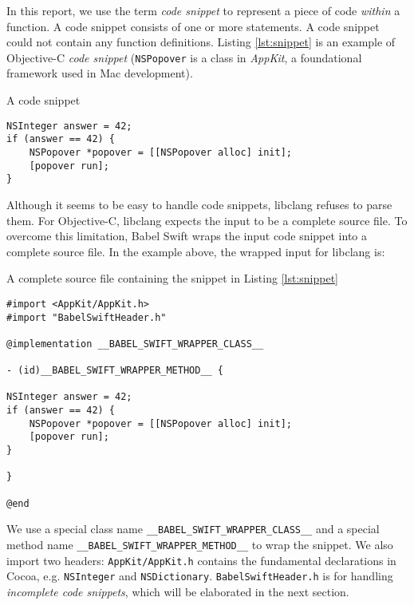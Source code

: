 \documentclass{sfuthesis}
\begin{document}
In this report, we use the term \emph{code snippet} to represent a piece of code \emph{within} a function. A code snippet consists of one or more statements. A code snippet could not contain any function definitions. Listing \ref{lst:snippet} is an example of Objective-C \emph{code snippet} (\texttt{NSPopover} is a class in \emph{AppKit}, a foundational framework used in Mac development).

\begin{listing}
\caption{A code snippet}
\label{lst:snippet}
\begin{verbatim}
NSInteger answer = 42;
if (answer == 42) {
    NSPopover *popover = [[NSPopover alloc] init];
    [popover run];
}
\end{verbatim}
\end{listing}

Although it seems to be easy to handle code snippets, libclang refuses to parse them. For Objective-C, libclang expects the input to be a complete source file. To overcome this limitation, Babel Swift wraps the input code snippet into a complete source file. In the example above, the wrapped input for libclang is:

\begin{listing}
\caption{A complete source file containing the snippet in Listing \ref{lst:snippet}}	
\label{lst:wrappedsnippet}
\begin{verbatim}
#import <AppKit/AppKit.h>
#import "BabelSwiftHeader.h"

@implementation __BABEL_SWIFT_WRAPPER_CLASS__

- (id)__BABEL_SWIFT_WRAPPER_METHOD__ {

NSInteger answer = 42;
if (answer == 42) {
    NSPopover *popover = [[NSPopover alloc] init];
    [popover run];
}

}

@end
\end{verbatim}
\end{listing}

We use a special class name \texttt{\_\_BABEL\_SWIFT\_WRAPPER\_CLASS\_\_} and a special method name \texttt{\_\_BABEL\_SWIFT\_WRAPPER\_METHOD\_\_} to wrap the snippet. We also import two headers: \texttt{AppKit/AppKit.h} contains the fundamental declarations in Cocoa, e.g. \texttt{NSInteger} and \texttt{NSDictionary}. \texttt{BabelSwiftHeader.h} is for handling \emph{incomplete code snippets}, which will be elaborated in the next section.

\end{document}

